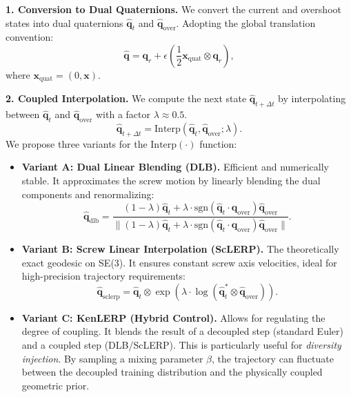 \documentclass[a4paper,11pt]{article}
\begin{document}
\textbf{1. Conversion to Dual Quaternions.}
We convert the current and overshoot states into dual quaternions $\hat{\bm{q}}_t$ and $\hat{\bm{q}}_{\text{over}}$. Adopting the global translation convention:
\begin{equation}
    \hat{\bm{q}} = \bm{q}_r + \epsilon \left( \frac{1}{2} \bm{x}_{\text{quat}} \otimes \bm{q}_r \right),
\end{equation}
where $\bm{x}_{\text{quat}} = (0, \bm{x})$.

\textbf{2. Coupled Interpolation.}
We compute the next state $\hat{\bm{q}}_{t+\Delta t}$ by interpolating between $\hat{\bm{q}}_t$ and $\hat{\bm{q}}_{\text{over}}$ with a factor $\lambda \approx 0.5$.
\begin{equation}
    \hat{\bm{q}}_{t+\Delta t} = \text{Interp}(\hat{\bm{q}}_t, \hat{\bm{q}}_{\text{over}}; \lambda).
\end{equation}
We propose three variants for the $\text{Interp}(\cdot)$ function:

\begin{itemize}
    \item \textbf{Variant A: Dual Linear Blending (DLB).} 
    Efficient and numerically stable. It approximates the screw motion by linearly blending the dual components and renormalizing:
    \begin{equation}
        \hat{\bm{q}}_{\text{dlb}} = \frac{(1-\lambda)\hat{\bm{q}}_t + \lambda \cdot \text{sgn}(\hat{\bm{q}}_t \cdot \hat{\bm{q}}_{\text{over}}) \hat{\bm{q}}_{\text{over}}}{\|(1-\lambda)\hat{\bm{q}}_t + \lambda \cdot \text{sgn}(\hat{\bm{q}}_t \cdot \hat{\bm{q}}_{\text{over}}) \hat{\bm{q}}_{\text{over}}\|}.
    \end{equation}
    
    \item \textbf{Variant B: Screw Linear Interpolation (ScLERP).}
    The theoretically exact geodesic on SE(3). It ensures constant screw axis velocities, ideal for high-precision trajectory requirements:
    \begin{equation}
        \hat{\bm{q}}_{\text{sclerp}} = \hat{\bm{q}}_t \otimes \exp\left( \lambda \cdot \log(\hat{\bm{q}}_t^* \otimes \hat{\bm{q}}_{\text{over}}) \right).
    \end{equation}
    
    \item \textbf{Variant C: KenLERP (Hybrid Control).}
    Allows for regulating the degree of coupling. It blends the result of a decoupled step (standard Euler) and a coupled step (DLB/ScLERP). This is particularly useful for \textit{diversity injection}. By sampling a mixing parameter $\beta$, the trajectory can fluctuate between the decoupled training distribution and the physically coupled geometric prior.
\end{itemize}
\end{document}
